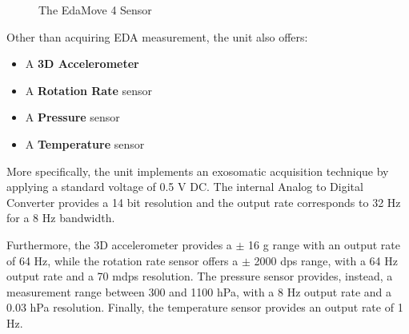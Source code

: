 \begin{figure}[htp]
    \centering
    \hfill%
    \caption{The EdaMove 4 Sensor}
    \label{fig:edamovesensor}
\end{figure}

Other than acquiring EDA measurement, the unit also offers:

\begin{itemize}
    \item A \textbf{3D Accelerometer}
    \item A \textbf{Rotation Rate} sensor
    \item A \textbf{Pressure} sensor
    \item A \textbf{Temperature} sensor
\end{itemize}

More specifically, the unit implements an exosomatic acquisition technique by applying a standard voltage of 0.5 V DC. The internal Analog to Digital Converter provides a 14 bit resolution and the output rate corresponds to 32 Hz for a 8 Hz bandwidth.

Furthermore, the 3D accelerometer provides a $\pm$ 16 g range with an output rate of 64 Hz, while the rotation rate sensor offers a $\pm$ 2000 dps range, with a 64 Hz output rate and a 70 mdps resolution. The pressure sensor provides, instead, a measurement range between 300 and 1100 hPa, with a 8 Hz output rate and a 0.03 hPa resolution. Finally, the temperature sensor provides an output rate of 1 Hz.

